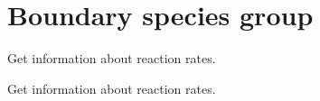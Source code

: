 \hypertarget{group__boundary}{
\section{\-Boundary species group}
\label{group__boundary}
}


\-Get information about reaction rates.  


\-Get information about reaction rates. 
